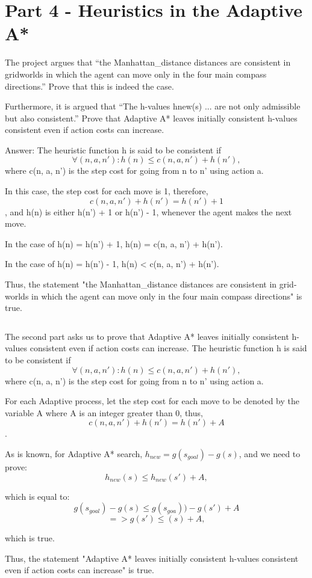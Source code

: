 \documentclass{article}
\begin{document}

\section{Part 4 - Heuristics in the Adaptive A*}

The project argues that “the Manhattan_distance distances are consistent in
gridworlds in which the agent can move only in the four main compass directions.” Prove that this is indeed the case.

Furthermore, it is argued that “The h-values hnew(s) ... are not only admissible but also consistent.” Prove that Adaptive A*
leaves initially consistent h-values consistent even if action costs can increase.
\newline


Answer: \newline
The heuristic function h is said to be consistent if 
$$ \forall(n, a, n'): h(n) \leq c(n, a, n') + h(n'),$$
where c(n, a, n') is the step cost for going from n to n' using action a.
\par In this case, the step cost for each move is 1, therefore, $$c(n, a, n') + h(n') = h(n') + 1$$ , and h(n) is either h(n') + 1 or h(n') - 1, whenever the agent makes the next move. \par In the case of h(n) = h(n') + 1, h(n) = c(n, a, n') + h(n'). \par In the case of h(n) = h(n') - 1, h(n) < c(n, a, n') + h(n').
\par Thus, the statement "the Manhattan_distance distances are consistent in grid-worlds in which the agent can move only in the four main compass directions" is true.



$$$$\par The second part asks us to prove that Adaptive A* leaves initially consistent h-values consistent even if action costs can increase. The heuristic function h is said to be consistent if 
$$ \forall(n, a, n'): h(n) \leq c(n, a, n') + h(n'),$$ where c(n, a, n') is the step cost for going from n to n' using action a.
\par For each Adaptive process, let the step cost for each move to be denoted by the variable A where A is an integer greater than 0, thus, $$c(n, a, n') + h(n') = h(n') + A$$ . 
\par As is known, for Adaptive A* search, $h_{new} = g(s_{goal}) - g(s)$, and we need to prove:
$$h_{new}(s) \leq h_{new}(s') + A,$$ 
\par which is equal to:
$$g(s_{goal}) - g(s) \leq g(s_{goa})) - g(s') + A$$
$$ => g(s') \leq (s) + A,$$ 
\par which is true.
\par Thus, the statement "Adaptive A* leaves initially consistent h-values consistent even if action costs can increase" is true.
\end{document}
